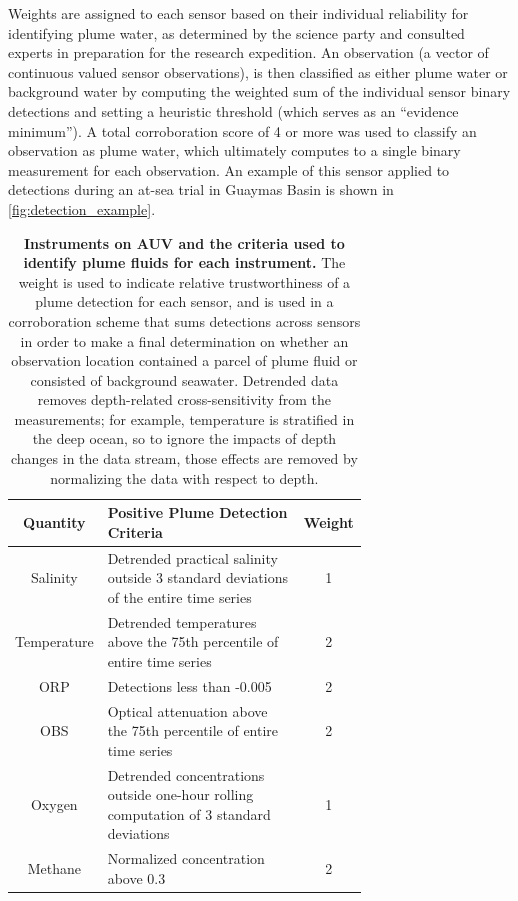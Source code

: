 Weights are assigned to each sensor based on their individual reliability for identifying plume water, as determined by the science party and consulted experts in preparation for the research expedition. An observation (a vector of continuous valued sensor observations), is then classified as either plume water or background water by computing the weighted sum of the individual sensor binary detections and setting a heuristic threshold (which serves as an ``evidence minimum''). A total corroboration score of 4 or more was used to classify an observation as plume water, which ultimately computes to a single binary measurement for each observation. An example of this sensor applied to \Sentry detections during an at-sea trial in Guaymas Basin is shown in \cref{fig:detection_example}.

\begin{table}[h!]
    \centering
    \begin{tabular}{c|p{0.7\linewidth}|c}
        Quantity & Positive Plume Detection Criteria & Weight  \\
        \hline
        Salinity & Detrended practical salinity outside 3 standard deviations of the entire time series & 1 \\
        Temperature & Detrended temperatures above the 75th percentile of entire time series & 2 \\
        ORP & Detections less than -0.005 & 2 \\
        OBS & Optical attenuation above the 75th percentile of entire time series & 2 \\
        Oxygen & Detrended concentrations outside one-hour rolling computation of 3 standard deviations & 1 \\
        Methane & Normalized concentration above 0.3 & 2
    \end{tabular}
    \caption[Instruments on AUV \Sentry and the criteria used to identify plume fluids for each instrument.]{\textbf{Instruments on AUV \Sentry and the criteria used to identify plume fluids for each instrument.} The weight is used to indicate relative trustworthiness of a plume detection for each sensor, and is used in a corroboration scheme that sums detections across sensors in order to make a final determination on whether an observation location contained a parcel of plume fluid or consisted of background seawater. Detrended data removes depth-related cross-sensitivity from the measurements; for example, temperature is stratified in the deep ocean, so to ignore the impacts of depth changes in the data stream, those effects are removed by normalizing the data with respect to depth.}
    \label{tab:sentry_instruments}
\end{table}

